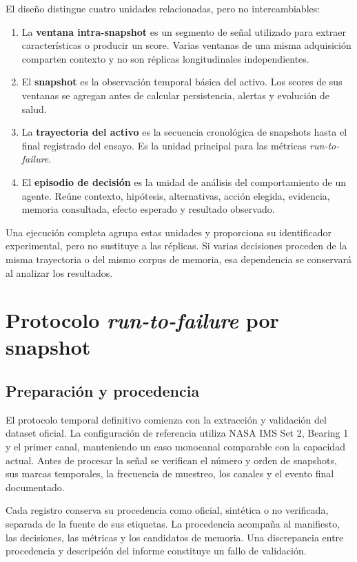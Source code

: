 El diseño distingue cuatro unidades relacionadas, pero no intercambiables:

\begin{enumerate}
  \item La \textbf{ventana intra-snapshot} es un segmento de señal utilizado
        para extraer características o producir un score. Varias ventanas de una
        misma adquisición comparten contexto y no son réplicas longitudinales
        independientes.
  \item El \textbf{snapshot} es la observación temporal básica del activo. Los
        scores de sus ventanas se agregan antes de calcular persistencia,
        alertas y evolución de salud.
  \item La \textbf{trayectoria del activo} es la secuencia cronológica de
        snapshots hasta el final registrado del ensayo. Es la unidad principal
        para las métricas \textit{run-to-failure}.
  \item El \textbf{episodio de decisión} es la unidad de análisis del
        comportamiento de un agente. Reúne contexto, hipótesis, alternativas,
        acción elegida, evidencia, memoria consultada, efecto esperado y
        resultado observado.
\end{enumerate}

Una ejecución completa agrupa estas unidades y proporciona su identificador
experimental, pero no sustituye a las réplicas. Si varias decisiones proceden
de la misma trayectoria o del mismo corpus de memoria, esa dependencia se
conservará al analizar los resultados.

\section{Protocolo \textit{run-to-failure} por snapshot}

\subsection{Preparación y procedencia}

El protocolo temporal definitivo comienza con la extracción y validación del
dataset oficial. La configuración de referencia utiliza NASA IMS Set 2,
Bearing 1 y el primer canal, manteniendo un caso monocanal comparable con la
capacidad actual. Antes de procesar la señal se verifican el número y orden de
snapshots, sus marcas temporales, la frecuencia de muestreo, los canales y el
evento final documentado.

Cada registro conserva su procedencia como oficial, sintética o no verificada,
separada de la fuente de sus etiquetas. La procedencia acompaña al manifiesto,
las decisiones, las métricas y los candidatos de memoria. Una discrepancia
entre procedencia y descripción del informe constituye un fallo de validación.

